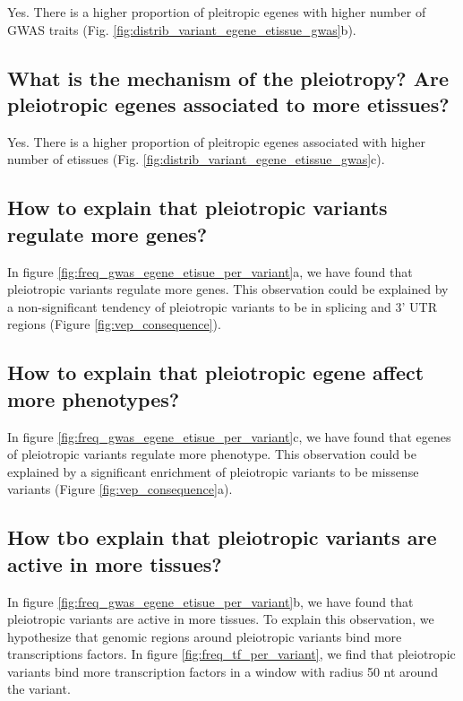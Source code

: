 Yes. There is a higher proportion of pleitropic egenes with higher number of GWAS traits (Fig. \ref{fig:distrib_variant_egene_etissue_gwas}b).

\subsection*{What is the mechanism of the pleiotropy? Are pleiotropic egenes associated to more etissues?}

Yes. There is a higher proportion of pleitropic egenes associated with higher number of etissues (Fig. \ref{fig:distrib_variant_egene_etissue_gwas}c).

\subsection*{How to explain that pleiotropic variants regulate more genes?}

In figure \ref{fig:freq_gwas_egene_etisue_per_variant}a, we have found that pleiotropic variants regulate more genes.
This observation could be explained by a non-significant tendency of pleiotropic variants to be in splicing and 3' UTR regions (Figure \ref{fig:vep_consequence}).

\subsection*{How to explain that pleiotropic egene affect more phenotypes?}

In figure \ref{fig:freq_gwas_egene_etisue_per_variant}c, we have found that egenes of pleiotropic variants regulate more phenotype.
This observation could be explained by a significant enrichment of pleiotropic variants to be missense variants (Figure \ref{fig:vep_consequence}a).

\subsection*{How tbo explain that pleiotropic variants are active in more tissues?}

In figure \ref{fig:freq_gwas_egene_etisue_per_variant}b, we have found that pleiotropic variants are active in more tissues.
To explain this observation, we hypothesize that genomic regions around pleiotropic variants bind more transcriptions factors.
In figure \ref{fig:freq_tf_per_variant}, we find that pleiotropic variants bind more transcription factors in a window with radius 50 nt around the variant.

